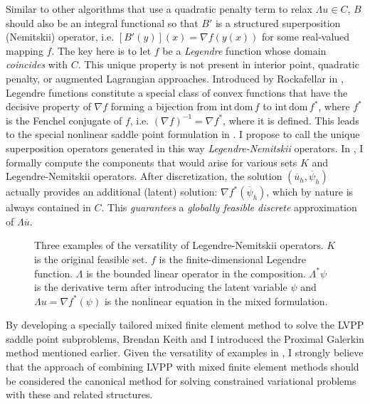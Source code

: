\documentclass[aspectratio=169,xcolor=dvipsnames,11pt]{beamer}
\begin{document}
\begin{frame}
Similar to other algorithms that use a quadratic penalty term to relax $\Lambda u \in C$, $B$ should also be an integral functional so that $B'$ is a structured superposition (Nemitskii) operator, i.e. $[B'(y)](x) = \nabla f(y(x))$ for some real-valued mapping $f$.  The key here is to let $f$ be a \textit{Legendre} function whose domain \textit{coincides} with $C$. This unique property is not present in interior point, quadratic penalty, or augmented Lagrangian approaches. Introduced by Rockafellar in \cite{RTRockafellar_1970}, Legendre functions constitute a special class of convex functions that have the decisive property of $\nabla f$ forming a bijection from $\mathrm{int\, dom\,} f$ to $\mathrm{int\, dom\,} f^*$, where $f^*$ is the Fenchel conjugate of $f$, i.e. $(\nabla f)^{-1} = \nabla f^*$, where it is defined. This leads to the special nonlinear saddle point formulation in . I propose to call the unique superposition operators generated in this way \textit{Legendre-Nemitskii} operators. In , I formally compute the components that would arise for various sets $K$ and Legendre-Nemitskii operators.  After discretization, the solution $(\overline{u}_h,\overline{\psi}_{h})$ actually provides an additional (latent) solution: $\nabla f^*(\overline{\psi}_h)$, which by nature is always contained in $C$. This \textit{guarantees} a \textit{globally feasible discrete} approximation of $\Lambda \overline{u}$.

\begin{figure}[h]
\caption{Three examples of the versatility of Legendre-Nemitskii operators. $K$ is the original feasible set. $f$ is the finite-dimensional Legendre function. $\Lambda$ is the bounded linear operator in the composition. $\Lambda^* \psi$ is the derivative term after introducing the latent variable $\psi$ and $\Lambda u = \nabla f^*(\psi)$ is the nonlinear equation in the mixed formulation.}
\label{fig:lvpp-transform-table}
\end{figure}
By developing a specially tailored mixed finite element method to solve the LVPP saddle point subproblems, Brendan Keith and I introduced the Proximal Galerkin method mentioned earlier. Given the versatility of examples in , I strongly believe that the approach of combining LVPP with mixed finite element methods should be considered the canonical method for solving constrained variational problems with these and related structures.\medskip

\end{frame}
\end{document}
